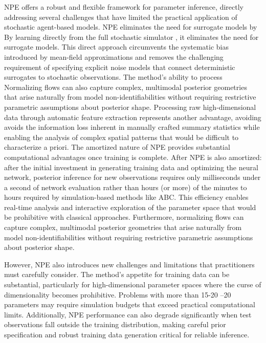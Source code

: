 \documentclass{article}
\providecommand{\DIFaddtex}[1]{{\protect\color{blue} \sf #1}} %
\providecommand{\DIFdeltex}[1]{{\protect\color{red} \scriptsize #1}} %
\providecommand{\DIFaddbegin}{} %
\providecommand{\DIFaddend}{} %
\providecommand{\DIFdelbegin}{} %
\providecommand{\DIFdelend}{} %
\providecommand{\DIFadd}[1]{\texorpdfstring{\DIFaddtex{#1}}{#1}} %
\providecommand{\DIFdel}[1]{\texorpdfstring{\DIFdeltex{#1}}{}} %
\newcommand{\DIFscaledelfig}{0.5}
\newlength{\DIFdelgraphicswidth} %
\newlength{\DIFdelgraphicsheight} %
\newcommand{\DIFaddincludegraphics}[2][]{{\color{blue}\fbox{\DIFOincludegraphics[#1]{#2}}}} %
\newcommand{\DIFdelincludegraphics}[2][]{%
\sbox{\DIFdelgraphicsbox}{\DIFOincludegraphics[#1]{#2}}%
\settoboxwidth{\DIFdelgraphicswidth}{\DIFdelgraphicsbox} %
\settoboxtotalheight{\DIFdelgraphicsheight}{\DIFdelgraphicsbox} %
\scalebox{\DIFscaledelfig}{%
\parbox[b]{\DIFdelgraphicswidth}{\usebox{\DIFdelgraphicsbox}\\[-\baselineskip] \rule{\DIFdelgraphicswidth}{0em}}\llap{\resizebox{\DIFdelgraphicswidth}{\DIFdelgraphicsheight}{%
\setlength{\unitlength}{\DIFdelgraphicswidth}%
\begin{picture}(1,1)%
\thicklines\linethickness{2pt} %
{\color[rgb]{1,0,0}\put(0,0){\framebox(1,1){}}}%
{\color[rgb]{1,0,0}\put(0,0){\line( 1,1){1}}}%
{\color[rgb]{1,0,0}\put(0,1){\line(1,-1){1}}}%
\end{picture}%
}\hspace*{3pt}}} %
} %
\DeclareRobustCommand{\DIFaddbegin}{\DIFOaddbegin \let\includegraphics\DIFaddincludegraphics} %
\DeclareRobustCommand{\DIFaddend}{\DIFOaddend \let\includegraphics\DIFOincludegraphics} %
\DeclareRobustCommand{\DIFdelbegin}{\DIFOdelbegin \let\includegraphics\DIFdelincludegraphics} %
\DeclareRobustCommand{\DIFdelend}{\DIFOaddend \let\includegraphics\DIFOincludegraphics} %
\begin{document}
NPE offers a robust and flexible framework for parameter inference, directly addressing several challenges that have limited the practical application of stochastic agent-based models. \DIFdelbegin \DIFdel{NPE eliminates the need for surrogate models by }\DIFdelend \DIFaddbegin \DIFadd{By }\DIFaddend learning directly from the full stochastic simulator\DIFaddbegin \DIFadd{, it eliminates the need for surrogate models}\DIFaddend . This direct approach circumvents the systematic bias introduced by mean-field approximations and removes the challenging requirement of specifying explicit noise models that connect deterministic surrogates to stochastic observations. \DIFdelbegin \DIFdel{The method's ability to process }\DIFdelend \DIFaddbegin \DIFadd{Normalizing flows can also capture complex, multimodal posterior geometries that arise naturally from model non-identifiabilities without requiring restrictive parametric assumptions about posterior shape. Processing }\DIFaddend raw high-dimensional data through automatic feature extraction \DIFdelbegin \DIFdel{represents another advantage, avoiding }\DIFdelend \DIFaddbegin \DIFadd{avoids }\DIFaddend the information loss inherent in manually crafted summary statistics while enabling the analysis of complex spatial patterns that would be difficult to characterize a priori. \DIFdelbegin \DIFdel{The amortized nature of NPE provides substantial computational advantages once training is complete. After }\DIFdelend \DIFaddbegin \DIFadd{NPE is also amortized: after }\DIFaddend the initial investment in generating training data and optimizing the neural network, posterior inference for new observations requires \DIFdelbegin \DIFdel{only milliseconds }\DIFdelend \DIFaddbegin \DIFadd{under a second }\DIFaddend of network evaluation rather than \DIFdelbegin \DIFdel{hours (or more) of }\DIFdelend \DIFaddbegin \DIFadd{the minutes to hours required by }\DIFaddend simulation-based methods like ABC.
\DIFdelbegin \DIFdel{This efficiency enables real-time analysis and interactive exploration of the parameter space that would be prohibitive with classical approaches. Furthermore, normalizing flows can capture complex, multimodal posterior geometries that arise naturally from model non-identifiabilities without requiring restrictive parametric assumptions about posterior shape.
}\DIFdelend 

However, NPE also introduces new challenges and limitations that practitioners must carefully consider. The method's appetite for training data can be substantial, particularly for high-dimensional parameter spaces where the curse of dimensionality becomes prohibitive. Problems with more than \DIFdelbegin \DIFdel{15-20 }\DIFdelend \DIFaddbegin \DIFadd{15--20 }\DIFaddend parameters may require simulation budgets that exceed practical computational limits. \DIFdelbegin \DIFdel{Additionally, }\DIFdelend NPE performance can \DIFaddbegin \DIFadd{also }\DIFaddend degrade significantly when test observations fall outside the training distribution, making careful prior specification and robust training data generation critical for reliable inference.
\end{document}
